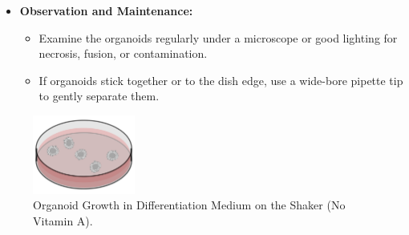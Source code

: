 \documentclass[11pt]{article}
\begin{document}
\begin{itemize}[leftmargin=*]
    \item \textbf{Observation and Maintenance:}
    \begin{itemize}[leftmargin=*]
        \item Examine the organoids regularly under a microscope or good lighting for necrosis, fusion, or contamination.
        \item If organoids stick together or to the dish edge, use a wide-bore pipette tip to gently separate them.
    \end{itemize}

\end{itemize}

\begin{figure}[H]
    \centering
    \includegraphics[width=0.3\textwidth]{4.png}
    \caption{Organoid Growth in Differentiation Medium on the Shaker (No Vitamin A).}
    \label{fig:organoid_growth}
\end{figure}

\end{document}
